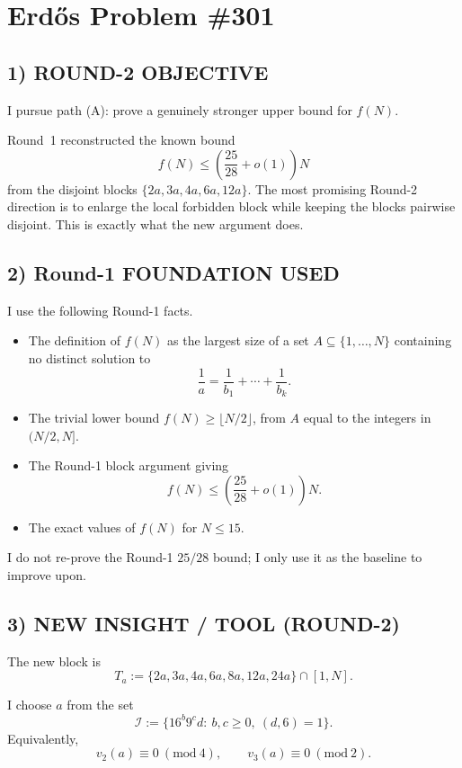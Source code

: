 \section{Erd\H{o}s Problem \#301}

\subsection*{1) ROUND-2 OBJECTIVE}

I pursue path (A): prove a genuinely stronger upper bound for $f(N)$.

Round~1 reconstructed the known bound
\[
f(N)\le \left(\frac{25}{28}+o(1)\right)N
\]
from the disjoint blocks $\{2a,3a,4a,6a,12a\}$. The most promising Round-2 direction is to enlarge the local forbidden block while keeping the blocks pairwise disjoint. This is exactly what the new argument does.

\subsection*{2) Round-1 FOUNDATION USED}

I use the following Round-1 facts.

\begin{itemize}
\item The definition of $f(N)$ as the largest size of a set $A\subseteq\{1,\ldots,N\}$ containing no distinct solution to
\[
\frac1a=\frac1{b_1}+\cdots+\frac1{b_k}.
\]
\item The trivial lower bound $f(N)\ge \lfloor N/2\rfloor$, from $A$ equal to the integers in $(N/2,N]$.
\item The Round-1 block argument giving
\[
f(N)\le \left(\frac{25}{28}+o(1)\right)N.
\]
\item The exact values of $f(N)$ for $N\le 15$.
\end{itemize}

I do not re-prove the Round-1 $25/28$ bound; I only use it as the baseline to improve upon.

\subsection*{3) NEW INSIGHT / TOOL (ROUND-2)}

The new block is
\[
T_a:=\{2a,3a,4a,6a,8a,12a,24a\}\cap[1,N].
\]

I choose $a$ from the set
\[
\mathcal{I}:=\{16^b 9^c d:\ b,c\ge 0,\ (d,6)=1\}.
\]
Equivalently,
\[
v_2(a)\equiv 0\ (\mathrm{mod}\ 4),
\qquad
v_3(a)\equiv 0\ (\mathrm{mod}\ 2).
\]

